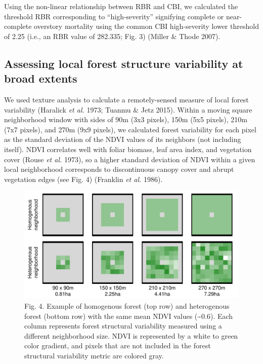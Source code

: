 \documentclass[]{article}
\begin{document}
Using the non-linear relationship between RBR and CBI, we calculated the
threshold RBR corresponding to ``high-severity'' signifying complete or
near-complete overstory mortality using the common CBI high-severity
lower threshold of 2.25 (i.e., an RBR value of 282.335; Fig. 3) (Miller
\& Thode 2007).

\hypertarget{assessing-local-forest-structure-variability-at-broad-extents}{%
\subsection{Assessing local forest structure variability at broad
extents}\label{assessing-local-forest-structure-variability-at-broad-extents}}

We used texture analysis to calculate a remotely-sensed measure of local
forest variability (Haralick \emph{et al.} 1973; Tuanmu \& Jetz 2015).
Within a moving square neighborhood window with sides of 90m (3x3
pixels), 150m (5x5 pixels), 210m (7x7 pixels), and 270m (9x9 pixels), we
calculated forest variability for each pixel as the standard deviation
of the NDVI values of its neighbors (not including itself). NDVI
correlates well with foliar biomass, leaf area index, and vegetation
cover (Rouse \emph{et al.} 1973), so a higher standard deviation of NDVI
within a given local neighborhood corresponds to discontinuous canopy
cover and abrupt vegetation edges (see Fig. 4) (Franklin \emph{et al.}
1986).

\begin{figure}
\centering
\includegraphics{../../figures/heterogeneity-demo-raster.pdf}
\caption{Fig. 4. Example of homogenous forest (top row) and heterogenous
forest (bottom row) with the same mean NDVI values
(\textasciitilde{}0.6). Each column represents forest structural
variability measured using a different neighborhood size. NDVI is
represented by a white to green color gradient, and pixels that are not
included in the forest structural variability metric are colored gray.}
\end{figure}
\end{document}
